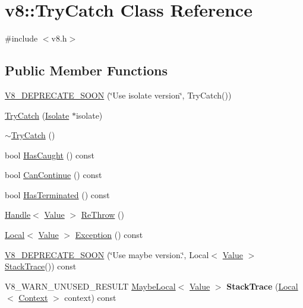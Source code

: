 \hypertarget{classv8_1_1_try_catch}{}\section{v8\+:\+:Try\+Catch Class Reference}
\label{classv8_1_1_try_catch}


{\ttfamily \#include $<$v8.\+h$>$}

\subsection*{Public Member Functions}
\begin{DoxyCompactItemize}
\item 
\hyperlink{classv8_1_1_try_catch_ae3b6a2248b687b2cbc5271fcc2e40d66}{V8\+\_\+\+D\+E\+P\+R\+E\+C\+A\+T\+E\+\_\+\+S\+O\+O\+N} (\char`\"{}Use isolate version\char`\"{}, Try\+Catch())
\item 
\hyperlink{classv8_1_1_try_catch_a623ce624491b383fae60c05d2aeefb1a}{Try\+Catch} (\hyperlink{classv8_1_1_isolate}{Isolate} $\ast$isolate)
\item 
\hyperlink{classv8_1_1_try_catch_a2c9ad4b40d17dd31c6dd020736b30679}{$\sim$\+Try\+Catch} ()
\item 
bool \hyperlink{classv8_1_1_try_catch_a48f704fbf2b82564b5d2a4ff596e4137}{Has\+Caught} () const 
\item 
bool \hyperlink{classv8_1_1_try_catch_a2ec467d4653d26c064d749cab98791cb}{Can\+Continue} () const 
\item 
bool \hyperlink{classv8_1_1_try_catch_a7e012477ac47db9480f85d55427987c7}{Has\+Terminated} () const 
\item 
\hyperlink{classv8_1_1_local}{Handle}$<$ \hyperlink{classv8_1_1_value}{Value} $>$ \hyperlink{classv8_1_1_try_catch_a4a7506617800bbc49c3c08bbfefb9c2d}{Re\+Throw} ()
\item 
\hyperlink{classv8_1_1_local}{Local}$<$ \hyperlink{classv8_1_1_value}{Value} $>$ \hyperlink{classv8_1_1_try_catch_a99c425f29b3355b4294cbe762377f99b}{Exception} () const 
\item 
\hyperlink{classv8_1_1_try_catch_ae8128ec2dae652a47c545d775c7778f7}{V8\+\_\+\+D\+E\+P\+R\+E\+C\+A\+T\+E\+\_\+\+S\+O\+O\+N} (\char`\"{}Use maybe version.\char`\"{}, Local$<$ \hyperlink{classv8_1_1_value}{Value} $>$ \hyperlink{classv8_1_1_stack_trace}{Stack\+Trace}()) const 
\item 
\hypertarget{classv8_1_1_try_catch_a449fe4cdc063d234f2bea39e9297ba28}{}V8\+\_\+\+W\+A\+R\+N\+\_\+\+U\+N\+U\+S\+E\+D\+\_\+\+R\+E\+S\+U\+L\+T \hyperlink{classv8_1_1_maybe_local}{Maybe\+Local}$<$ \hyperlink{classv8_1_1_value}{Value} $>$ {\bfseries Stack\+Trace} (\hyperlink{classv8_1_1_local}{Local}$<$ \hyperlink{classv8_1_1_context}{Context} $>$ context) const \label{classv8_1_1_try_catch_a449fe4cdc063d234f2bea39e9297ba28}


\end{DoxyCompactItemize}
